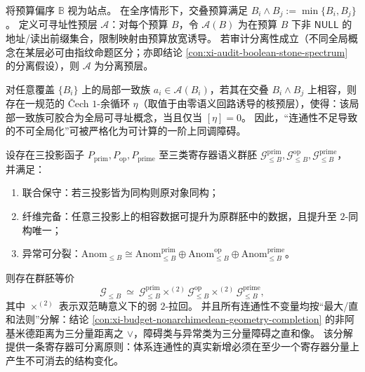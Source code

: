 \begin{conclusion}\label{con:xi-addressability-presheaf-gluing-h1-obstruction}
将预算偏序 \(\mathbb{B}\) 视为站点。
在全序情形下，交叠预算满足 \(B_i\wedge B_j:=\min\{B_i,B_j\}\)。
定义可寻址性预层 \(\mathcal{A}\)：对每个预算 \(B\)，令 \(\mathcal{A}(B)\) 为在预算 \(B\) 下非 \(\mathsf{NULL}\) 的地址/读出前缀集合，限制映射由预算放宽诱导。
若审计分离性成立（不同全局概念在某层必可由指纹命题区分；亦即结论 \ref{con:xi-audit-boolean-stone-spectrum} 的分离假设），则 \(\mathcal{A}\) 为分离预层。

对任意覆盖 \(\{B_i\}\) 上的局部一致族 \(a_i\in\mathcal{A}(B_i)\)，若其在交叠 \(B_i\wedge B_j\) 上相容，则存在一规范的 \v{C}ech \(1\)-余循环 \(\eta\)（取值于由零语义回路诱导的核预层），使得：该局部一致族可胶合为全局可寻址概念，当且仅当 \([\eta]=0\)。
因此，“连通性不足导致的不可全局化”可被严格化为可计算的一阶上同调障碍。
\end{conclusion}

\begin{conclusion}\label{con:xi-three-projection-2pullback-register-separability}
设存在三投影函子
\(
P_{\mathrm{prim}},P_{\mathrm{op}},P_{\mathrm{prime}}
\)
至三类寄存器语义群胚
\(
\mathcal{G}_{\le B}^{\mathrm{prim}},\mathcal{G}_{\le B}^{\mathrm{op}},\mathcal{G}_{\le B}^{\mathrm{prime}}
\)，
并满足：
\begin{enumerate}
  \item 联合保守：若三投影皆为同构则原对象同构；
  \item 纤维完备：任意三投影上的相容数据可提升为原群胚中的数据，且提升至 \(2\)-同构唯一；
  \item 异常可分裂：\(\mathrm{Anom}_{\le B}\cong \mathrm{Anom}_{\le B}^{\mathrm{prim}}\oplus \mathrm{Anom}_{\le B}^{\mathrm{op}}\oplus \mathrm{Anom}_{\le B}^{\mathrm{prime}}\)。
\end{enumerate}
则存在群胚等价
\[
\mathcal{G}_{\le B}\ \simeq\ 
\mathcal{G}_{\le B}^{\mathrm{prim}}\times^{(2)}\mathcal{G}_{\le B}^{\mathrm{op}}\times^{(2)}\mathcal{G}_{\le B}^{\mathrm{prime}},
\]
其中 \(\times^{(2)}\) 表示双范畴意义下的弱 \(2\)-拉回。
并且所有连通性不变量均按“最大/直和法则”分解：结论 \ref{con:xi-budget-nonarchimedean-geometry-completion} 的非阿基米德距离为三分量距离之 \(\vee\)，障碍类与异常类为三分量障碍之直和像。
该分解提供一条寄存器可分离原则：体系连通性的真实新增必须在至少一个寄存器分量上产生不可消去的结构变化。
\end{conclusion}

